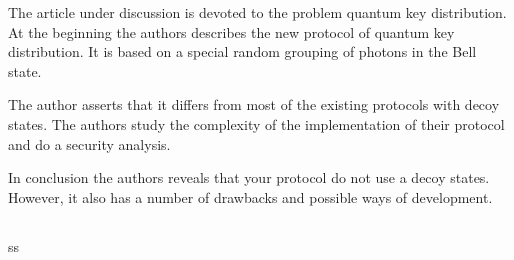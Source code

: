 The article under discussion is devoted to the problem quantum key distribution. At the beginning the authors describes the new protocol of quantum key distribution. It is based on a special random grouping of photons in the Bell state.

The author asserts that it differs from most of the existing protocols with decoy states. The authors study the complexity of the implementation of their protocol and do a security analysis.

In conclusion the authors reveals that your protocol do not use a decoy states. However, it also has a number of drawbacks and possible ways of development.

\subsection{\dic}
ss